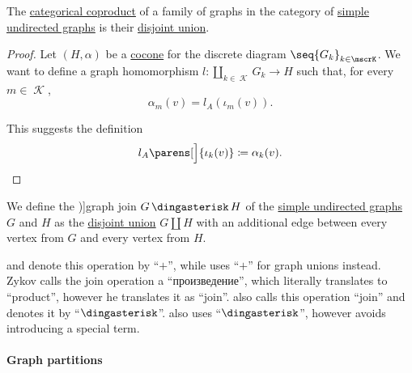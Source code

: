 \begin{proposition}\label{thm:undirected_graph_coproduct}
  The \hyperref[def:discrete_category_limits]{categorical coproduct} of a family of graphs in the category of \hyperref[def:undirected_graph]{simple undirected graphs} is their \hyperref[def:graph_disjoint_union]{disjoint union}.
\end{proposition}
\begin{proof}
  Let \( (H, \alpha) \) be a \hyperref[def:category_of_cones/cocone]{cocone} for the discrete diagram \( \seq{ G_k }_{k \in \mscrK} \). We want to define a graph homomorphism \( l: \coprod_{k \in \mscrK} G_k \to H \) such that, for every \( m \in \mscrK \),
  \begin{equation*}
    \alpha_m(v) = l_A(\iota_m(v)).
  \end{equation*}

  This suggests the definition
  \begin{equation*}
    l_A\parens[\Big]{ \iota_k(v) } \coloneqq \alpha_k(v).
  \end{equation*}
\end{proof}

\begin{definition}\label{def:graph_join}
  We define the \term[ru=соединение (графов) (\cite[265]{Новиков2013})]{graph join} \( G \Ast H \) of the \hyperref[def:undirected_graph]{simple undirected graphs} \( G \) and \( H \) as the \hyperref[def:graph_disjoint_union]{disjoint union} \( G \coprod H \) with an additional edge between every vertex from \( G \) and every vertex from \( H \).
\end{definition}
\begin{comments}
  \item {} and  denote this operation by \enquote{\( + \)}, while  uses \enquote{\( + \)} for graph unions instead. Zykov calls the join operation a \enquote{произведение}, which literally translates to \enquote{product}, however he translates it as \enquote{join}.  also calls this operation \enquote{join} and denotes it by \enquote{\( \Ast \)}.  also uses \enquote{\( \Ast \)}, however avoids introducing a special term.
\end{comments}

\paragraph{Graph partitions}

